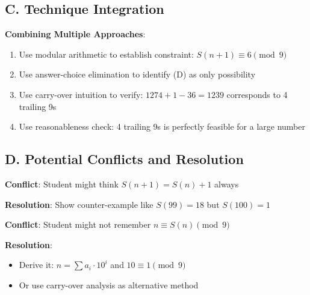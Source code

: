 \documentclass[]{article}
\begin{document}
\begin{techniquesbox}
\subsection*{C. Technique Integration}
\textbf{Combining Multiple Approaches}:
\begin{enumerate}
    \item Use modular arithmetic to establish constraint: $S(n+1) \equiv 6 \pmod{9}$
    \item Use answer-choice elimination to identify (D) as only possibility
    \item Use carry-over intuition to verify: $1274 + 1 - 36 = 1239$ corresponds to 4 trailing 9s
    \item Use reasonableness check: 4 trailing 9s is perfectly feasible for a large number
\end{enumerate}

\subsection*{D. Potential Conflicts and Resolution}
\textbf{Conflict}: Student might think $S(n+1) = S(n) + 1$ always

\textbf{Resolution}: Show counter-example like $S(99) = 18$ but $S(100) = 1$

\textbf{Conflict}: Student might not remember $n \equiv S(n) \pmod{9}$

\textbf{Resolution}: 
\begin{itemize}
    \item Derive it: $n = \sum a_i \cdot 10^i$ and $10 \equiv 1 \pmod{9}$
    \item Or use carry-over analysis as alternative method
\end{itemize}
\end{techniquesbox}
\end{document}
